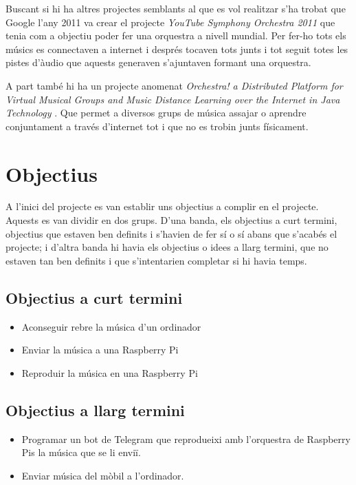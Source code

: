 \documentclass[a4paper]{article}
\begin{document}
Buscant si hi ha altres projectes semblants al que es vol realitzar s'ha trobat que Google l'any 2011 va crear el projecte \emph{YouTube Symphony Orchestra 2011}\cite{YoutubeSymphoni} que tenia com a objectiu poder fer una orquestra a nivell mundial. Per fer-ho tots els músics es connectaven a internet i després tocaven tots junts i tot seguit totes les pistes d'àudio que aquests generaven s'ajuntaven formant una orquestra.

A part també hi ha un projecte anomenat \emph{Orchestra! a Distributed Platform for Virtual Musical Groups and Music Distance Learning over the Internet in Java \texttrademark Technology} \cite{Orchestra}. Que permet a diversos grups de música assajar o aprendre conjuntament a través d'internet tot i que no es trobin junts físicament.

\section{Objectius}
A l'inici del projecte es van establir uns objectius a complir en el projecte. Aquests es van dividir en dos grups. D'una banda, els objectius a curt termini, objectius que estaven ben definits i s'havien de fer sí o sí abans que s'acabés el projecte; i d'altra banda hi havia els objectius o idees a llarg termini, que no estaven tan ben definits i que s'intentarien completar si hi havia temps.

\subsection{Objectius a curt termini}
\begin{itemize}
	\item Aconseguir rebre la música d'un ordinador
	\item Enviar la música a una Raspberry Pi
	\item Reproduir la música en una Raspberry Pi
\end{itemize}

\subsection{Objectius a llarg termini}
\begin{itemize}
	\item Programar un bot de Telegram que reprodueixi amb l'orquestra de Raspberry Pis la música que se li enviï.
	\item Enviar música del mòbil a l'ordinador.
\end{itemize}
\end{document}
